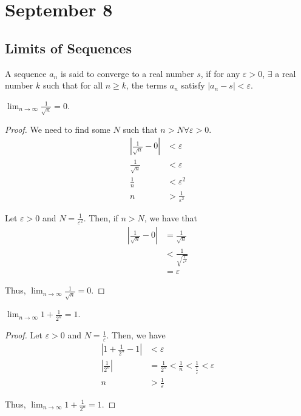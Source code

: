 \section{September 8}

\subsection{Limits of Sequences}
\begin{definition}
    A sequence $a_n$ is said to converge to a real number $s$, if for any $\varepsilon > 0$, $\exists$ a real number $k$ such that for all $n \geq k$, the terms $a_n$ satisfy $|a_n - s| < \varepsilon$.
\end{definition}

\begin{theorem}
    $\lim_{n \to \infty} \frac{1}{\sqrt{n}} = 0$.
\end{theorem}
\begin{proof}
    We need to find some $N$ such that $n > N \forall \varepsilon > 0$.
    \begin{align*}
        | \frac{1}{\sqrt{n}} - 0 | &< \varepsilon \\
        \frac{1}{\sqrt{n}} &< \varepsilon \\
        \frac{1}{n} &< \varepsilon^2 \\
        n &> \frac{1}{\varepsilon^2}
    \end{align*}
    
    Let $\varepsilon > 0$ and $N = \frac{1}{\varepsilon^2}$. Then, if $n > N$, we have that
    \begin{align*}
        | \frac{1}{\sqrt{n}} - 0 | &= \frac{1}{\sqrt{n}} \\
        &< \frac{1}{\sqrt{\frac{1}{\varepsilon^2}}} \\
        &= \varepsilon
    \end{align*}

    Thus, $\lim_{n \to \infty} \frac{1}{\sqrt{n}} = 0$.
\end{proof}

\begin{theorem}
    $\lim_{n \to \infty} 1 + \frac{1}{2^n} = 1$.
\end{theorem}
\begin{proof}
    Let $\varepsilon > 0$ and $N = \frac{1}{\varepsilon}$. Then, we have
    \begin{align*}
        | 1 + \frac{1}{2^n} - 1 | &< \varepsilon \\
        | \frac{1}{2^n} | &= \frac{1}{2^n} < \frac{1}{n} < \frac{1}{\frac{1}{\varepsilon}} < \varepsilon \\
        n &> \frac{1}{\varepsilon}
    \end{align*}

    Thus, $\lim_{n \to \infty} 1 + \frac{1}{2^n} = 1$.
\end{proof}

